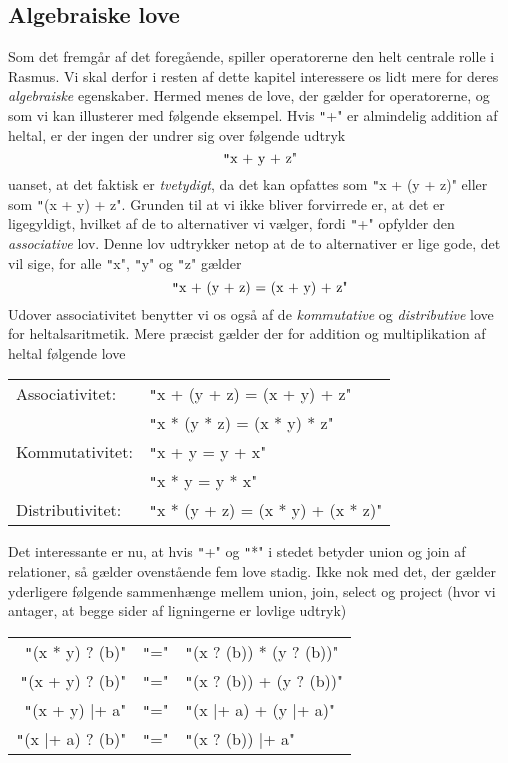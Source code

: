 \documentclass{article}
\newcounter{eks}
\begin{document}
\subsection{Algebraiske love}
Som det fremg\aa{}r af det foreg\aa{}ende, spiller operatorerne
den helt centrale rolle i {\sc Rasmus}. Vi skal derfor i resten af
dette kapitel interessere os lidt mere for deres {\em algebraiske\/}
egenskaber. Hermed menes de love, der g\ae{}lder for operatorerne,
og som vi kan illusterer med f\o{}lgende eksempel. Hvis \texttt"+" er
almindelig addition af heltal, er der ingen der undrer sig over
f\o{}lgende udtryk
$$ \mbox{\texttt"x + y + z"} $$
uanset, at det faktisk er {\em tvetydigt}, da det kan opfattes 
som \texttt"x + (y + z)" eller som \texttt"(x + y) + z". Grunden til at
vi ikke bliver forvirrede er, at det er ligegyldigt, hvilket af de
to alternativer vi v\ae{}lger, fordi \texttt"+" opfylder den
{\em associative} lov. Denne lov udtrykker netop at de to alternativer
er lige gode, det vil sige, for alle \texttt"x", \texttt"y" og \texttt"z"
g\ae{}lder
$$ \mbox{\texttt"x + (y + z) = (x + y) + z"} $$
Udover associativitet benytter vi os ogs\aa{} af de {\em kommutative\/}
og {\em distributive\/} love for heltalsaritmetik. Mere pr\ae{}cist
g\ae{}lder der for addition og multiplikation af heltal
f\o{}lgende love
\begin{center}
\begin{tabular}{ll}
Associativitet: & \texttt"x + (y + z) = (x + y) + z" \\
                & \texttt"x * (y * z) = (x * y) * z" \\
Kommutativitet: & \texttt"x + y = y + x"\\
                & \texttt"x * y = y * x"\\
Distributivitet: & \texttt"x * (y + z) = (x * y) + (x * z)"
\end{tabular}
\end{center}
Det interessante er nu, at hvis \texttt"+" og \texttt"*" i stedet betyder
union og join af relationer, s\aa{} g\ae{}lder ovenst\aa{}ende
fem love stadig. Ikke nok med det, der g\ae{}lder yderligere
f\o{}lgende sammenh\ae{}nge mellem union, join, select og project
(hvor vi antager, at begge sider af ligningerne er lovlige udtryk)
\begin{center}
\begin{tabular}{rcl}
 \texttt"(x * y) ? (b)" & \texttt"=" & \texttt"(x ? (b)) * (y ? (b))"\\
 \texttt"(x + y) ? (b)" & \texttt"=" & \texttt"(x ? (b)) + (y ? (b))"\\
 \texttt"(x + y) |+ a" & \texttt"=" & \texttt"(x |+ a) + (y |+ a)"\\
 \texttt"(x |+ a) ? (b)" & \texttt"=" & \texttt"(x ? (b)) |+ a"
\end{tabular}
\end{center}
\end{document}
